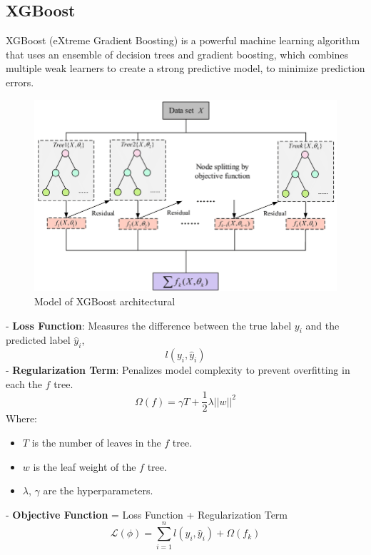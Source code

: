 \documentclass{ieeeojies}
\begin{document}
\subsection{XGBoost}
XGBoost (eXtreme Gradient Boosting) is a powerful machine learning algorithm that uses an ensemble of decision trees and gradient boosting, which combines multiple weak learners to create a strong predictive model, to minimize prediction errors.\\
\begin{figure} [H]
    \centering
    \includegraphics[width=0.8\linewidth]{./image/XGBoost.png}
    \caption{Model of XGBoost architectural}
    \label{fig:10}
\end{figure}
\noindent
- \textbf{Loss Function}: Measures the difference between the true label \(y_i\) and the predicted label \(\hat{y}_i\),\\
\begin{dmath*}
    l(y_i, \hat{y}_i) 
\end{dmath*}
- \textbf{Regularization Term}: Penalizes model complexity to prevent overfitting in each the \(f\) tree.\\
\begin{dmath*}
    \Omega(f) = \gamma T + \frac{1}{2} \lambda ||w||^2
\end{dmath*}
Where:
\begin{itemize}
    \item \(T\) is the number of leaves in the \(f\) tree.
    \item \(w\) is the leaf weight of the \(f\) tree.
    \item \(\lambda\), \(\gamma\)  are the  hyperparameters.
\end{itemize}
- \textbf{Objective Function} = Loss Function + Regularization Term
\begin{dmath*}
    \mathcal{L}(\phi) = \sum_{i=1}^n l(y_i, \hat{y}_i) + \Omega(f_k)
\end{dmath*}
\end{document}
